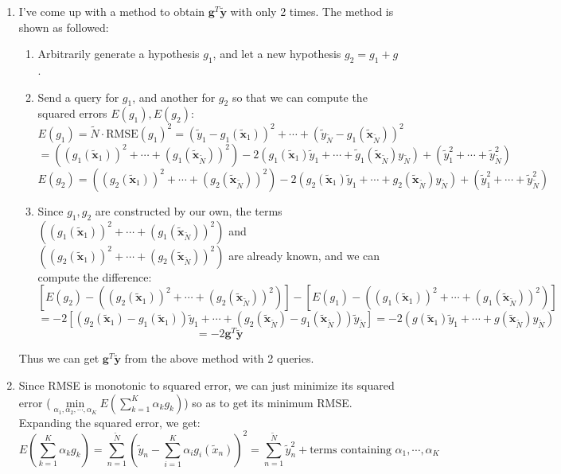 \documentclass[11pt]{article}
\begin{document}
\begin{enumerate}[label=\textbf{\arabic*}.]
    \item I've come up with a method to obtain $\mathbf{g}^T\mathbf{\tilde{y}}$ with only 2 times. The method is shown as followed:
      \begin{enumerate}
        \item Arbitrarily generate a hypothesis $g_1$, and let a new hypothesis $g_2 = g_1 + g$.
        \item Send a query for $g_1$, and another for $g_2$ so that we can compute the squared errors $E(g_1), E(g_2)$:
        \[E(g_1) = \tilde{N}\cdot\text{RMSE}(g_1)^2 = (\tilde{y}_1-g_1(\mathbf{\tilde{x}}_1))^2+\cdots + (\tilde{y}_{\tilde{N}}-g_1(\mathbf{\tilde{x}}_{\tilde{N}}))^2\]
        \[= ( (g_1(\mathbf{\tilde{x}}_1))^2 + \cdots + (g_1(\mathbf{\tilde{x}}_{\tilde{N}}))^2 )-2(g_1(\mathbf{\tilde{x}}_1)\tilde{y}_1+ \cdots + \tilde{g}_1(\mathbf{\tilde{x}}_{\tilde{N}})y_{\tilde{N}})+(\tilde{y}_1^2+ \cdots + \tilde{y}_{\tilde{N}}^2)\]
        \[E(g_2) = ( (g_2(\mathbf{\tilde{x}}_1))^2 +  \cdots + (g_2(\mathbf{\tilde{x}}_{\tilde{N}}))^2 )-2(g_2(\mathbf{\tilde{x}}_1)\tilde{y}_1+  \cdots + g_2(\mathbf{\tilde{x}}_{\tilde{N}})y_{\tilde{N}})+(\tilde{y}_1^2+ \cdots + \tilde{y}_{\tilde{N}}^2)\]
        \item Since $g_1, g_2$ are constructed by our own, the terms $( (g_1(\mathbf{\tilde{x}}_1))^2 + \cdots + (g_1(\mathbf{\tilde{x}}_{\tilde{N}}))^2 )$ and $( (g_2(\mathbf{\tilde{x}}_1))^2 +  \cdots + (g_2(\mathbf{\tilde{x}}_{\tilde{N}}))^2 )$ are already known, and we can compute the difference: 
        \[[E(g_2) - ( (g_2(\mathbf{\tilde{x}}_1))^2 +  \cdots + (g_2(\mathbf{\tilde{x}}_{\tilde{N}}))^2 )] - [E(g_1) - ( (g_1(\mathbf{\tilde{x}}_1))^2 + \cdots + (g_1(\mathbf{\tilde{x}}_{\tilde{N}}))^2 )]\]
        \[ = -2 [(g_2(\mathbf{\tilde{x}}_1) - g_1(\mathbf{\tilde{x}}_1))\tilde{y}_1 + \cdots + (g_2(\mathbf{\tilde{x}}_{\tilde{N}}) - g_1(\mathbf{\tilde{x}}_{\tilde{N}}))\tilde{y}_{\tilde{N}}] = -2 (g(\mathbf{\tilde{x}}_1)\tilde{y}_1+  \cdots + g(\mathbf{\tilde{x}}_{\tilde{N}})y_{\tilde{N}})\]
        \[= -2 \mathbf{g}^T \mathbf{\tilde{y}}\]
      \end{enumerate}
      Thus we can get $\mathbf{g}^T \mathbf{\tilde{y}}$ from the above method with 2 queries.

  

    \item Since RMSE is monotonic to squared error, we can just minimize its squared error ($\underset{\alpha_1, \alpha_2, \cdots , \alpha_K} \min E(\sum_{k=1}^K \alpha_k g_k)$) so as to get its minimum RMSE. Expanding the squared error, we get:
    \[E(\sum_{k=1}^K \alpha_k g_k) = \sum_{n=1}^{\tilde{N}}\left(\tilde{y}_n - \sum_{i=1}^{K}\alpha_i g_i(\tilde{x}_n)\right)^2 = \sum_{n=1}^{\tilde{N}} \tilde{y}_n^2 + \text{terms containing }\alpha_1,\cdots,\alpha_K\]


\end{enumerate}
\end{document}

